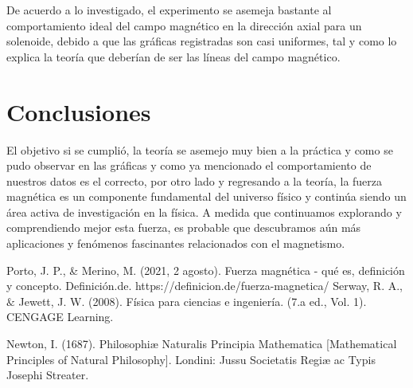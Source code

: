 \documentclass{article}
\begin{document}
De acuerdo a lo investigado, el experimento se asemeja bastante al comportamiento ideal del campo magnético en la dirección axial para un solenoide, debido a que las gráficas registradas son casi uniformes, tal y como lo explica la teoría que deberían de ser las líneas del campo magnético.


\section{Conclusiones}\label{Conclusiones}				%
El objetivo si se cumplió, la teoría se asemejo muy bien a la práctica y como se pudo observar en las gráficas y como ya mencionado el comportamiento de nuestros datos es el correcto, por otro lado
y regresando a la teoría, la fuerza magnética es un componente fundamental del universo físico y continúa siendo un área activa de investigación en la física. A medida que continuamos explorando y comprendiendo mejor esta fuerza, es probable que descubramos aún más aplicaciones y fenómenos fascinantes relacionados con el magnetismo. 

\begin{thebibliography}{9}						%
 Porto, J. P., \& Merino, M. (2021, 2 agosto). Fuerza magnética - qué es, definición y concepto. Definición.de. https://definicion.de/fuerza-magnetica/
	Serway, R. A., $\&$ Jewett, J. W. (2008). Física para ciencias e ingeniería. (7.a
ed., Vol. 1). CENGAGE Learning.

	Newton, I. (1687). Philosophiæ Naturalis Principia Mathematica [Mathematical Principles of Natural Philosophy]. Londini: Jussu Societatis Regiæ ac Typis Josephi Streater.

\end{thebibliography}
\end{document}
